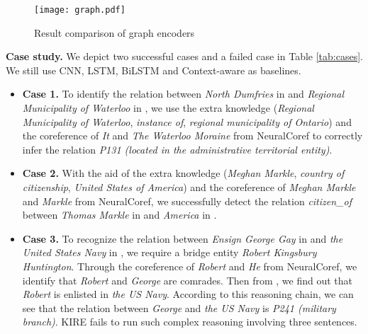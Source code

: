\documentclass[runningheads]{llncs}
\begin{document}
\begin{figure}[!tb]
	\centering
	\texttt{[image: graph.pdf]}
	\caption{Result comparison of graph encoders}
	\label{fig:graph}
\end{figure}


\textbf{Case study.}  
We depict two successful cases and a failed case in Table \ref{tab:cases}. We still use CNN, LSTM, BiLSTM and Context-aware as baselines.
\begin{itemize}
\item \textbf{Case 1.} To identify the relation between \textit{North Dumfries} in  and \textit{Regional Municipality of Waterloo} in , we use the extra knowledge (\textit{Regional Municipality of Waterloo}, \textit{instance of}, \textit{regional municipality of Ontario}) and the coreference of \textit{It} and \textit{The Waterloo Moraine} from NeuralCoref to correctly infer the relation \textit{P131 (located in the administrative territorial entity)}.

\item \textbf{Case 2.} With the aid of the extra knowledge (\textit{Meghan Markle}, \textit{country of citizenship}, \textit{United States of America}) and the coreference of \textit{Meghan Markle} and \textit{Markle} from NeuralCoref, we successfully detect the relation \textit{citizen\_of} between \textit{Thomas Markle} in  and \textit{America} in .

\item \textbf{Case 3.} To recognize the relation between \textit{Ensign George Gay} in  and \textit{the United States Navy} in , we require a bridge entity \textit{Robert Kingsbury Huntington}. 
Through the coreference of \textit{Robert} and \textit{He} from NeuralCoref, we identify that \emph{Robert} and \textit{George} are comrades. 
Then from , we find out that \textit{Robert} is enlisted in \textit{the US Navy}. 
According to this reasoning chain, we can see that the relation between \textit{George} and \textit{the US Navy} is \textit{P241 (military branch)}. 
KIRE fails to run such complex reasoning involving three sentences.
\end{itemize}
\end{document}
